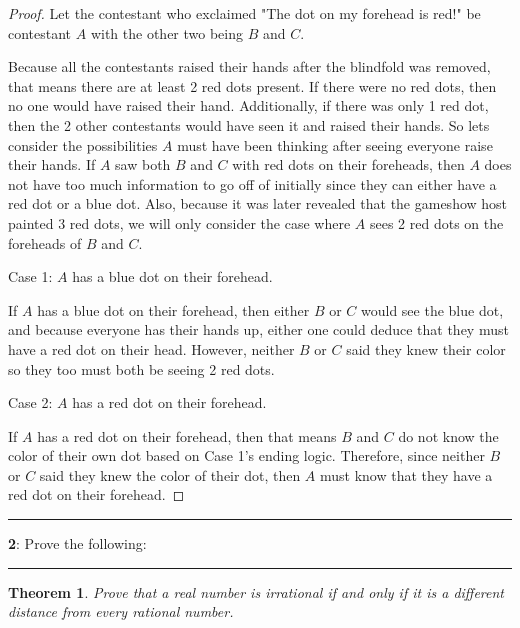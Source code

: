 \documentclass[11pt]{article}
\newtheorem{theorem}{Theorem}
\newcommand\question[2]{\vspace{.25in}\hrule\textbf{#1}: #2\vspace{.5em}\hrule\vspace{.10in}}
\begin{document}
\begin{proof}
	Let the contestant who exclaimed "The dot on my forehead is red!" be contestant $A$ with the other two being $B$ and $C$. 

	Because all the contestants raised their hands after the blindfold was removed, that means there are at least 2 red dots present. If there were no red dots, then no one would have raised their hand. Additionally, if there was only 1 red dot, then the 2 other contestants would have seen it and raised their hands. So lets consider the possibilities $A$ must have been thinking after seeing everyone raise their hands. If $A$ saw both $B$ and $C$ with red dots on their foreheads, then $A$ does not have too much information to go off of initially since they can either have a red dot or a blue dot. Also, because it was later revealed that the gameshow host painted 3 red dots, we will only consider the case where $A$ sees 2 red dots on the foreheads of $B$ and $C$.

	Case 1: $A$ has a blue dot on their forehead.

	If $A$ has a blue dot on their forehead, then either $B$ or $C$ would see the blue dot, and because everyone has their hands up, either one could deduce that they must have a red dot on their head. However, neither $B$ or $C$ said they knew their color so they too must both be seeing 2 red dots.

	Case 2: $A$ has a red dot on their forehead.

	If $A$ has a red dot on their forehead, then that means $B$ and $C$ do not know the color of their own dot based on Case 1's ending logic. Therefore, since neither $B$ or $C$ said they knew the color of their dot, then $A$ must know that they have a red dot on their forehead.
\end{proof}



\question{2}{Prove the following:}
\begin{theorem}
	Prove that a real number is irrational if and only if it is a different distance from every rational number.
\end{theorem}
\end{document}
